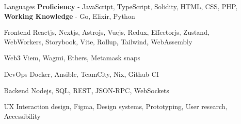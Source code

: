 

\begin{cvskills}

  \cvskill
    {Languages} %
    {\textbf{Proficiency} - JavaScript, TypeScript, Solidity, HTML, CSS, PHP, \textbf{Working Knowledge} - Go, Elixir, Python} %

  \cvskill
    {Frontend} %
    {Reactjs, Nextjs, Astrojs, Vuejs, Redux, Effectorjs, Zustand, WebWorkers, Storybook, Vite, Rollup, Tailwind, WebAssembly} %

  \cvskill
    {Web3} %
    {Viem, Wagmi, Ethers, Metamask snaps} %

  \cvskill
    {DevOps} %
    {Docker, Ansible, TeamCity, Nix, Github CI} %

  \cvskill
    {Backend} %
    {Nodejs, SQL, REST, JSON-RPC, WebSockets} %

  \cvskill
    {UX} %
    {Interaction design, Figma, Design systems, Prototyping, User research, Accessibility} %

\end{cvskills}
